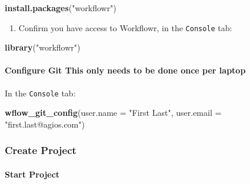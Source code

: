 \documentclass[openany]{article}
\newenvironment{Shaded}{\begin{snugshade}}{\end{snugshade}}
\newcommand{\DataTypeTok}[1]{\textcolor[rgb]{0.13,0.29,0.53}{#1}}
\newcommand{\KeywordTok}[1]{\textcolor[rgb]{0.13,0.29,0.53}{\textbf{#1}}}
\newcommand{\NormalTok}[1]{#1}
\newcommand{\StringTok}[1]{\textcolor[rgb]{0.31,0.60,0.02}{#1}}
\providecommand{\tightlist}{%
  \setlength{\itemsep}{0pt}\setlength{\parskip}{0pt}}
\let\oldparagraph\paragraph
\renewcommand{\paragraph}[1]{\oldparagraph{#1}\mbox{}}
\begin{document}
\begin{Shaded}
\begin{Highlighting}[]
\KeywordTok{install.packages}\NormalTok{(}\StringTok{"workflowr"}\NormalTok{)}
\end{Highlighting}
\end{Shaded}

\begin{enumerate}
\def\labelenumi{\arabic{enumi}.}
\setcounter{enumi}{2}
\tightlist
\item
  Confirm you have access to Workflowr, in the \texttt{Console} tab:
\end{enumerate}

\begin{Shaded}
\begin{Highlighting}[]
\KeywordTok{library}\NormalTok{(}\StringTok{"workflowr"}\NormalTok{)}
\end{Highlighting}
\end{Shaded}

\hypertarget{configure-git-this-only-needs-to-be-done-once-per-laptop}{%
\paragraph{\texorpdfstring{Configure Git\emph{
}This only needs to be done once per laptop}{Configure Git This only needs to be done once per laptop}}\label{configure-git-this-only-needs-to-be-done-once-per-laptop}}

In the \texttt{Console} tab:

\begin{Shaded}
\begin{Highlighting}[]
\KeywordTok{wflow_git_config}\NormalTok{(}\DataTypeTok{user.name =} \StringTok{"First Last"}\NormalTok{, }\DataTypeTok{user.email =} \StringTok{"first.last@agios.com"}\NormalTok{)}
\end{Highlighting}
\end{Shaded}

\hypertarget{create-project}{%
\subsubsection{Create Project}\label{create-project}}

\hypertarget{start-project}{%
\paragraph{Start Project}\label{start-project}}
\end{document}
